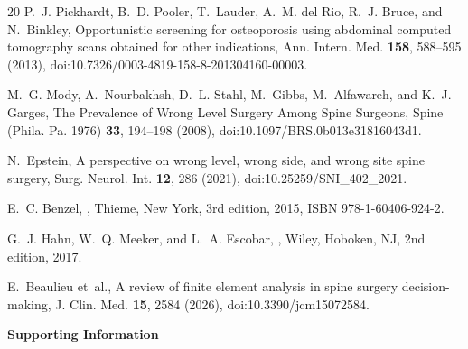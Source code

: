 \documentclass[aapm,mph,amsmath,amssymb,reprint]{revtex4-2}
\newif\ifcaptionlist \captionlistfalse
\newif\ifsupplement \supplementtrue
\begin{document}
\begin{thebibliography}{20}
P.~J. Pickhardt, B.~D. Pooler, T.~Lauder, A.~M. del Rio, R.~J. Bruce, and N.~Binkley,
\newblock Opportunistic screening for osteoporosis using abdominal computed tomography scans obtained for other indications,
\newblock Ann. Intern. Med. {\bf 158}, 588--595 (2013),
\newblock doi:10.7326/0003-4819-158-8-201304160-00003.

M.~G. Mody, A.~Nourbakhsh, D.~L. Stahl, M.~Gibbs, M.~Alfawareh, and K.~J. Garges,
\newblock The Prevalence of Wrong Level Surgery Among Spine Surgeons,
\newblock Spine (Phila. Pa. 1976) {\bf 33}, 194--198 (2008),
\newblock doi:10.1097/BRS.0b013e31816043d1.

N.~Epstein,
\newblock A perspective on wrong level, wrong side, and wrong site spine surgery,
\newblock Surg. Neurol. Int. {\bf 12}, 286 (2021),
\newblock doi:10.25259/SNI\_402\_2021.

E.~C. Benzel,
,
\newblock Thieme, New York, 3rd edition, 2015,
\newblock ISBN 978-1-60406-924-2.

G.~J. Hahn, W.~Q. Meeker, and L.~A. Escobar,
,
\newblock Wiley, Hoboken, NJ, 2nd edition, 2017.

E.~Beaulieu et~al.,
\newblock A review of finite element analysis in spine surgery decision-making,
\newblock J. Clin. Med. {\bf 15}, 2584 (2026),
\newblock doi:10.3390/jcm15072584.

\end{thebibliography}


\ifcaptionlist\fi

\ifsupplement
\clearpage
\onecolumngrid
\begin{center}{\large\bfseries Supporting Information}\end{center}

\fi
\end{document}
